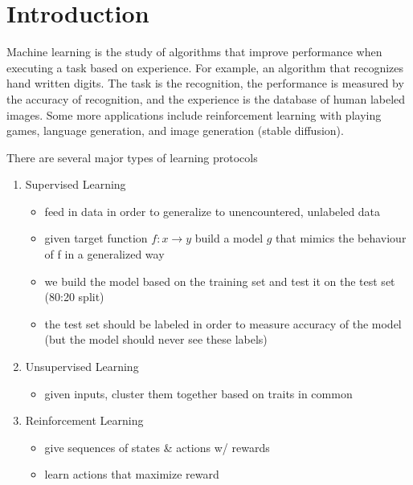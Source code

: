 \chapter{Introduction}

Machine learning is the study of algorithms that improve performance when executing a task based on experience. For example, an algorithm that recognizes hand written digits. The task is the recognition, the performance is measured by the accuracy of recognition, and the experience is the database of human labeled images. Some more applications include reinforcement learning with playing games, language generation, and image generation (stable diffusion).

There are several major types of learning protocols
\begin{enumerate}
    \item Supervised Learning
    \begin{itemize}
        \item feed in  data in order to generalize to unencountered, unlabeled data
        \item given target function $f: x \rightarrow y$ build a model $g$ that mimics the behaviour of f in a generalized way
        \item we build the model based on the training set and test it on the test set (80:20 split)
        \item the test set should be labeled in order to measure accuracy of the model (but the model should never see these labels)
    \end{itemize}
    \item Unsupervised Learning
    \begin{itemize}
        \item given  inputs, cluster them together based on traits in common
        \begin{center} 
        \end{center}
    \end{itemize}
    \item Reinforcement Learning
    \begin{itemize}
        \item give sequences of states \& actions w/ rewards
        \item learn actions that maximize reward
    \end{itemize}
\end{enumerate}

